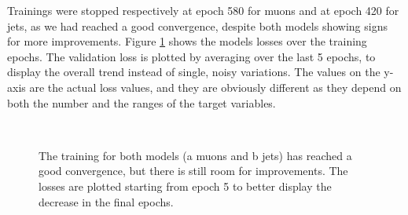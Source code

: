 Trainings were stopped respectively at epoch 580 for muons and at epoch 420 for jets, as we had reached a good convergence, despite both models showing signs for more improvements. Figure \ref{fig:losses} shows the models losses over the training epochs. The validation loss is plotted by averaging over the last 5 epochs, to display the overall trend instead of single, noisy variations. The values on the y-axis are the actual loss values, and they are obviously different as they depend on both the number and the ranges of the target variables.


\begin{figure}
    \myfloatalign
     \\
    \caption[Models losses]{The training for both models (a muons and b jets) has reached a good convergence, but there is still room for improvements. The losses are plotted starting from epoch 5 to better display the decrease in the final epochs.}\label{fig:losses}
    
\end{figure}

